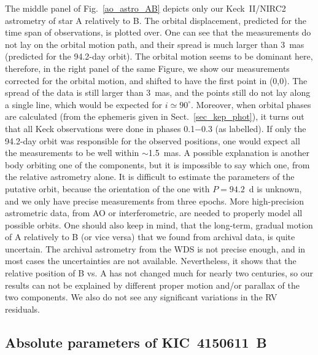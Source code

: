 \documentclass{aa}
\begin{document}
The middle panel of Fig.~\ref{ao_astro_AB} depicts only our Keck~II/NIRC2 astrometry of star 
A relatively to B. The orbital displacement, predicted for the time span of observations, is
plotted over. One can see that the measurements do not lay on the orbital motion path, and
their spread is much larger than 3~mas (predicted for the 94.2-day orbit). The orbital motion
seems to be dominant here, therefore, in the right panel of the same Figure, we show our 
measurements corrected for the orbital motion, and shifted to have the first point in (0,0). 
The spread of the data is still larger than 3~mas, and the points still do not lay along 
a single line, which would be expected for $i\simeq90^\circ$. Moreover, when orbital 
phases are calculated (from the ephemeris given in Sect.~\ref{sec_kep_phot}), it turns out that 
all Keck observations were done in phases 0.1$-$0.3 (as labelled). If only the 94.2-day orbit was 
responsible for the observed positions, one would expect all the measurements to be well within 
$\sim$1.5~mas. A possible explanation is another body orbiting one of the components, but it 
is impossible to say which one, from the relative astrometry alone. It is difficult to estimate 
the parameters of the putative orbit, because the orientation of the one with $P=94.2$~d is unknown, 
and we only have precise measurements from three epochs. More high-precision astrometric data,
from AO or interferometric, are needed to properly model 
all possible orbits. One should also keep in mind, that the long-term, gradual motion of A 
relatively to B (or vice versa) that we found from archival data, is quite uncertain. The archival 
astrometry from the WDS is not precise enough, and in most cases the uncertainties are not available. 
Nevertheless, it shows that the relative position of B vs. A has not changed much for nearly 
two centuries, so our results can not be explained by different proper motion and/or parallax 
of the two components. We also do not see any significant variations in the RV residuals.


\subsection{Absolute parameters of KIC~4150611~B}
\end{document}
